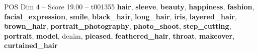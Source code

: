 \begin{textsample}{POS Dim 4 – Score 19.00 – t001355}  \label{ex:f4_pos_026}
\textbf{hair}, \textbf{sleeve}, \textbf{beauty}, \textbf{happiness}, \textbf{fashion}, \textbf{facial\_expression}, \textbf{smile}, \textbf{black\_hair}, \textbf{long\_hair}, \textbf{iris}, \textbf{layered\_hair}, \textbf{brown\_hair}, \textbf{portrait\_photography}, \textbf{photo\_shoot}, \textbf{step\_cutting}, \textbf{portrait}, \textbf{model}, denim, \textbf{pleased}, \textbf{feathered\_hair}, \textbf{throat}, \textbf{makeover}, \textbf{curtained\_hair}

\end{textsample}
